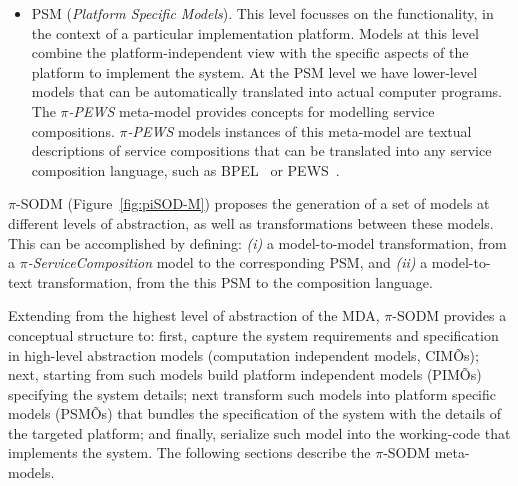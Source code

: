 \begin{itemize}
  \item PSM (\textit{Platform Specific Models}). This level focusses on the functionality, in the context of a particular implementation platform.
Models at this level combine the platform-independent view with the specific aspects of the platform to implement the system. At the PSM level we have lower-level models that can be automatically translated into actual computer programs. The \textit{$\pi$-PEWS} meta-model provides concepts for modelling service compositions. \textit{$\pi$-PEWS} models instances of this meta-model are textual descriptions of service compositions that can be translated into any service composition language, such as BPEL~\cite{bpel03} or PEWS~\cite{BaCAM05,Placido2010LTPD}.

\end{itemize}


$\pi$-SODM (Figure~\ref{fig:piSOD-M}) proposes the generation of a set of models at different levels of abstraction, as well as transformations between these models.
This can be accomplished by defining: \textit{(i)} a model-to-model transformation, from a \textit{$\pi$-ServiceComposition} model to the corresponding PSM, and \textit{(ii)} a model-to-text transformation, from the this PSM to the composition language.

Extending from the highest level of abstraction of the MDA, $\pi$-SODM provides  a conceptual structure to: first, capture the system requirements and specification in high-level abstraction models (computation independent models, CIMÕs); next,  starting from such models build platform independent models (PIMÕs) specifying the system details; next transform such models into platform specific models (PSMÕs) that bundles the specification of the system with the details of the targeted platform; and finally, serialize such model into the working-code that implements the system. 
The following sections describe the $\pi$-SODM meta-models.

%


